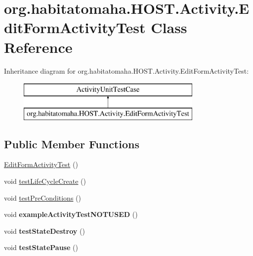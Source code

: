 \hypertarget{classorg_1_1habitatomaha_1_1_h_o_s_t_1_1_activity_1_1_edit_form_activity_test}{\section{org.\-habitatomaha.\-H\-O\-S\-T.\-Activity.\-Edit\-Form\-Activity\-Test Class Reference}
\label{classorg_1_1habitatomaha_1_1_h_o_s_t_1_1_activity_1_1_edit_form_activity_test}
}
Inheritance diagram for org.\-habitatomaha.\-H\-O\-S\-T.\-Activity.\-Edit\-Form\-Activity\-Test\-:\begin{figure}[H]
\begin{center}
\leavevmode
\includegraphics[height=2.000000cm]{classorg_1_1habitatomaha_1_1_h_o_s_t_1_1_activity_1_1_edit_form_activity_test}
\end{center}
\end{figure}
\subsection*{Public Member Functions}
\begin{DoxyCompactItemize}
\item 
\hyperlink{classorg_1_1habitatomaha_1_1_h_o_s_t_1_1_activity_1_1_edit_form_activity_test_a841881fa137d0a3558fa2c92846ba465}{Edit\-Form\-Activity\-Test} ()
\item 
void \hyperlink{classorg_1_1habitatomaha_1_1_h_o_s_t_1_1_activity_1_1_edit_form_activity_test_a05d4058b86b484f9b770b337d8c1e61f}{test\-Life\-Cycle\-Create} ()
\item 
void \hyperlink{classorg_1_1habitatomaha_1_1_h_o_s_t_1_1_activity_1_1_edit_form_activity_test_acda7c44bcd3aeebc79f0ca535d5e9c70}{test\-Pre\-Conditions} ()
\item 
\hypertarget{classorg_1_1habitatomaha_1_1_h_o_s_t_1_1_activity_1_1_edit_form_activity_test_adda5892e7f067d8c775371ad9a58f20d}{void {\bfseries example\-Activity\-Test\-N\-O\-T\-U\-S\-E\-D} ()}\label{classorg_1_1habitatomaha_1_1_h_o_s_t_1_1_activity_1_1_edit_form_activity_test_adda5892e7f067d8c775371ad9a58f20d}

\item 
\hypertarget{classorg_1_1habitatomaha_1_1_h_o_s_t_1_1_activity_1_1_edit_form_activity_test_a2635a802cb9229c01f3e60fd107a8584}{void {\bfseries test\-State\-Destroy} ()}\label{classorg_1_1habitatomaha_1_1_h_o_s_t_1_1_activity_1_1_edit_form_activity_test_a2635a802cb9229c01f3e60fd107a8584}

\item 
\hypertarget{classorg_1_1habitatomaha_1_1_h_o_s_t_1_1_activity_1_1_edit_form_activity_test_a7f5b27ab3928842373c036af132a7c8b}{void {\bfseries test\-State\-Pause} ()}\label{classorg_1_1habitatomaha_1_1_h_o_s_t_1_1_activity_1_1_edit_form_activity_test_a7f5b27ab3928842373c036af132a7c8b}

\end{DoxyCompactItemize}

